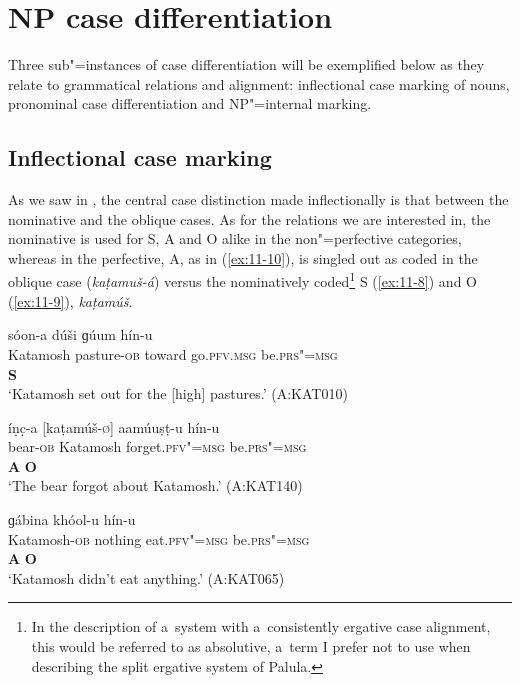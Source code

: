 \section{NP case differentiation}
\label{sec:11-2}

Three sub"=instances of case differentiation will be exemplified below as they relate to grammatical relations and alignment: inflectional case marking of nouns, pronominal case differentiation and NP"=internal marking.


\subsection{Inflectional case marking}
\label{subsec:11-2-1}


As we saw in , the central case distinction made inflectionally is that between the nominative and the oblique cases. As for the relations we are interested in, the nominative is used for S, A and O alike in the non"=perfective categories, whereas in the perfective, A, as in (\ref{ex:11-10}), is singled out as coded in the oblique case (\textit{kaṭamuš-á}) versus the nominatively coded\footnote{In the description of a~system with a~consistently ergative case alignment, this would be referred to as absolutive, a~term I prefer not to use when describing the split ergative system of Palula.} S (\ref{ex:11-8}) and O (\ref{ex:11-9}), \textit{kaṭamúš}.

\begin{exe}
\ex
\label{ex:11-8}
 sóon-a dúši ɡúum  hín-u \\
Katamosh pasture-\textsc{ob} toward go.\textsc{pfv.msg}  be.\textsc{prs"=msg} \\
\textbf{S} \\
\glt `Katamosh set out for the [high] pastures.' (A:KAT010)

\ex
\label{ex:11-9}
\glll íṇc̣-a [kaṭamúš-\textsc{ø}] aamúuṣṭ-u hín-u \\
bear-\textsc{ob} Katamosh forget.\textsc{pfv"=msg} be.\textsc{prs"=msg} \\
 \textbf{A} \textbf{O} \\
\glt `The bear forgot about Katamosh.' (A:KAT140)

\ex
\label{ex:11-10}
\glll [kaṭamuš-á] ɡábina khóol-u hín-u \\
Katamosh-\textsc{ob} nothing eat.\textsc{pfv"=msg} be.\textsc{prs"=msg} \\
 \textbf{A} \textbf{O} \\
\glt `Katamosh didn't eat anything.' (A:KAT065)
\end{exe}

